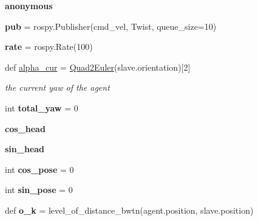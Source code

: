 \begin{DoxyCompactItemize}
{\bfseries anonymous}
\item 
\mbox{\label{namespaceagent__driver_ac8d2be5c1df0ac01c96a822ddf12af05}} 
{\bfseries pub} = rospy.\+Publisher(\textquotesingle{}cmd\+\_\+vel\textquotesingle{}, Twist, queue\+\_\+size=10)
\item 
\mbox{\label{namespaceagent__driver_ae1397d65f221ef8d5d31ac453b6c0506}} 
{\bfseries rate} = rospy.\+Rate(100)
\item 
\mbox{\label{namespaceagent__driver_a7cc62c7cce7f7b052d6c6dee070dd165}} 
def \hyperlink{namespaceagent__driver_a7cc62c7cce7f7b052d6c6dee070dd165}{alpha\+\_\+cur} = \hyperlink{namespaceagent__driver_aa2528ff29007a94600f692a960ec32dd}{Quad2\+Euler}(slave.\+orientation)\mbox{[}2\mbox{]}
\begin{DoxyCompactList}\small\item\em the current yaw of the agent \end{DoxyCompactList}\item 
\mbox{\label{namespaceagent__driver_aa0f26cb55bd5e7966557e6da7a007bda}} 
int {\bfseries total\+\_\+yaw} = 0
\item 
\mbox{\label{namespaceagent__driver_a5f1ba44d7b9c3aea5706d3668ddeaa63}} 
{\bfseries cos\+\_\+head}
\item 
\mbox{\label{namespaceagent__driver_a4b5ec2ea4895b642f90a43807739eec2}} 
{\bfseries sin\+\_\+head}
\item 
\mbox{\label{namespaceagent__driver_a3c6fe69f5adc8f21c13c3359821af4f4}} 
int {\bfseries cos\+\_\+pose} = 0
\item 
\mbox{\label{namespaceagent__driver_a7a469b18b8ec17c491d6a31419467246}} 
int {\bfseries sin\+\_\+pose} = 0
\item 
\mbox{\label{namespaceagent__driver_af6d9c4c0863cb7aa820e332c16562500}} 
def {\bfseries o\+\_\+k} = level\+\_\+of\+\_\+distance\+\_\+bwtn(agent.\+position, slave.\+position)
\item 

\end{DoxyCompactItemize}
